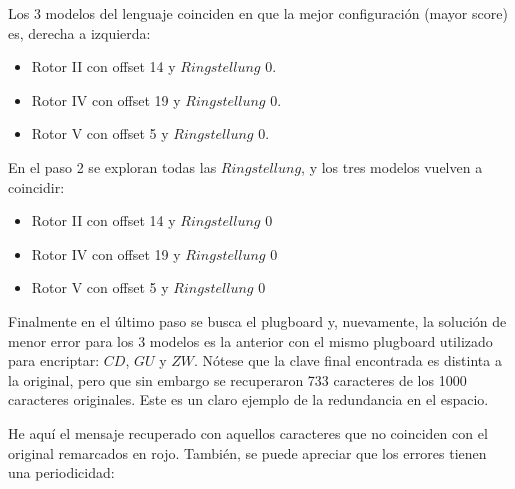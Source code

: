 \documentclass[a4paper,10pt]{article}
\begin{document}
Los 3 modelos del lenguaje coinciden en que la mejor configuración (mayor score) es, derecha a izquierda:

\begin{itemize}
  \item Rotor II con offset 14 y $Ringstellung$ 0.
  \item Rotor IV con offset 19 y $Ringstellung$ 0.
  \item Rotor V con offset 5 y $Ringstellung$ 0.
\end{itemize}

En el paso 2 se exploran todas las $Ringstellung$, y los tres modelos vuelven a coincidir:

\begin{itemize}
  \item Rotor II con offset 14 y $Ringstellung$ 0
  \item Rotor IV con offset 19 y $Ringstellung$ 0
  \item Rotor V con offset 5 y $Ringstellung$ 0
\end{itemize}

Finalmente en el último paso se busca el plugboard y, nuevamente, la solución de menor error para los 3 modelos es la anterior con el mismo plugboard utilizado para encriptar: $CD$, $GU$ y $ZW$. 
Nótese que la clave final encontrada es distinta a la original, pero que sin embargo se recuperaron 733 caracteres de los 1000 caracteres originales. Este es un claro ejemplo de la redundancia en el espacio.

He aquí el mensaje recuperado con aquellos caracteres que no coinciden con el original remarcados en rojo. También, se puede apreciar que los errores tienen una periodicidad:
\end{document}
